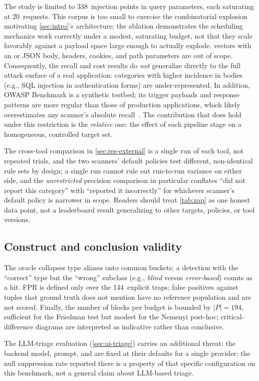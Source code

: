 The study is limited to \num{338}~injection points in  query
parameters, each saturating at \num{20}~requests. This corpus is too small
to exercise the combinatorial explosion motivating
\cref{sec:intro}'s architecture; the ablation demonstrates the scheduling
mechanics work correctly under a modest, saturating budget, not that they
scale favorably against a payload space large enough to actually explode.
 vectors with an
 or JSON body, headers, cookies, and
path parameters are out of scope. Consequently, the recall and cost results
do \emph{not} generalize directly to the full attack surface of a real
application: categories with higher incidence in  bodies (e.g.,
SQL injection in authentication forms) are under-represented. In addition,
OWASP Benchmark is a synthetic testbed; its trigger payloads and response
patterns are more regular than those of production applications, which likely
overestimates any scanner's absolute
recall~\cite{doupe2010johnny}. The contribution that does hold under this
restriction is the \emph{relative} one: the effect of each pipeline stage on a
homogeneous, controlled target set.

The cross-tool comparison in \cref{sec:res-external} is a single run of each
tool, not repeated trials, and the two scanners' default policies test
different, non-identical rule sets by design; a single run cannot rule out
run-to-run variance on either side, and the \emph{unrestricted} precision
comparison in particular conflates ``did not report this category'' with
``reported it incorrectly'' for whichever scanner's default policy is
narrower in scope. Readers should treat \cref{tab:zap} as one honest data
point, not a leaderboard result generalizing to other targets, policies, or
tool versions.

\subsection{Construct and conclusion validity}

The oracle collapses type aliases onto common buckets; a detection with the
``correct'' type but the ``wrong'' subclass (e.g., \emph{blind} versus
\emph{error-based}) counts as a hit. FPR is defined only over the
\num{144}~explicit traps; false positives against tuples that ground truth
does not mention have no reference population and are not scored. Finally, the
number of blocks per budget is bounded by $\lvert P \rvert = 194$, sufficient
for the Friedman test but modest for the Nemenyi post-hoc; critical-difference
diagrams are interpreted as indicative rather than conclusive.

The LLM-triage evaluation (\cref{sec:ai-triage}) carries an additional threat:
the backend model, prompt, and  are fixed at their
defaults for a single provider; the null suppression rate reported there is a
property of that specific configuration on this benchmark, not a general
claim about LLM-based triage.

